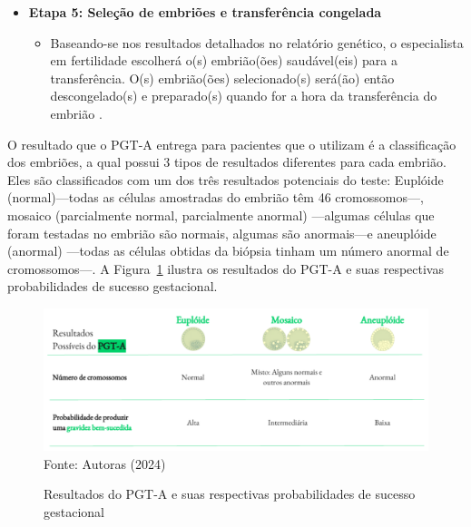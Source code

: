 \begin{itemize}
    \item \textbf{Etapa 5: Seleção de embriões e transferência congelada}
    \begin{itemize}
        \item Baseando-se nos resultados detalhados no relatório genético, o especialista em fertilidade escolherá o(s) embrião(ões) saudável(eis) para a transferência. O(s) embrião(ões) selecionado(s) será(ão) então descongelado(s) e preparado(s) quando for a hora da transferência do embrião \cite{cnyfertility2024}. 
    \end{itemize}
\end{itemize}

O resultado que o PGT-A entrega para pacientes que o utilizam é a classificação dos embriões, a qual possui 3 tipos de resultados diferentes para cada embrião. Eles são classificados com um dos três resultados potenciais do teste: Euplóide (normal)—todas as células amostradas do embrião têm 46 cromossomos—, mosaico (parcialmente normal, parcialmente anormal) —algumas células que foram testadas no embrião são normais, algumas são anormais—e aneuplóide (anormal) —todas as células obtidas da biópsia tinham um número anormal de cromossomos—\cite{cnyfertility2024}. A Figura~\ref{fig:ResultadosPGT} ilustra os resultados do PGT-A e suas respectivas probabilidades de sucesso gestacional.

\begin{center}
    \begin{figure}[h]
        \captionsetup{font=footnotesize, justification=centering, labelsep=period, position=above}
        \caption{Resultados do PGT-A e suas respectivas probabilidades de sucesso gestacional}
        \label{fig:ResultadosPGT}
        \centering
        \includegraphics[scale=0.5]{figuras/ResultadosPGT.pdf}
        \vspace{0.3cm} 
        \scriptsize{Fonte: Autoras (2024)}
    \end{figure}
\end{center}

